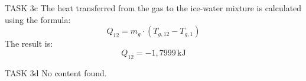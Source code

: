TASK 3c  
The heat transferred from the gas to the ice-water mixture is calculated using the formula:  
\[
Q_{12} = m_g \cdot (T_{g,12} - T_{g,1})
\]  
The result is:  
\[
Q_{12} = -1,7999 \, \text{kJ}
\]  

TASK 3d  
No content found.